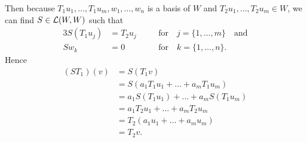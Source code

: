 \documentclass[a5paper]{article}
\begin{document}
    Then because $T_1u_1,\dots,T_1u_m,w_1,\dots,w_n$ is a basis of $W$ and $T_2u_1,\dots,T_2u_m \in W$, we can find $S \in \mathcal{L}(W,W)$ such that
\begin{alignat*}{3}
        S(T_1u_j) &= T_2u_j && \quad\text{for}\quad j=\{1,\dots,m\} \quad\text{and} \\
             Sw_k &= 0      && \quad\text{for}\quad k=\{1,\dots,n\} .
\end{alignat*}
    Hence
\begin{align*}
        (ST_1)(v) &= S( T_1v ) \\
                  &= S( a_1T_1u_1 + \dots + a_mT_1u_m ) \\
                  &= a_1 S(T_1u_1) + \dots + a_m S(T_1u_m) \\
                  &= a_1T_2u_1 + \dots + a_mT_2u_m \\
                  &= T_2(a_1u_1 + \dots + a_mu_m) \\
                  &= T_2v .
\end{align*}
\end{document}
